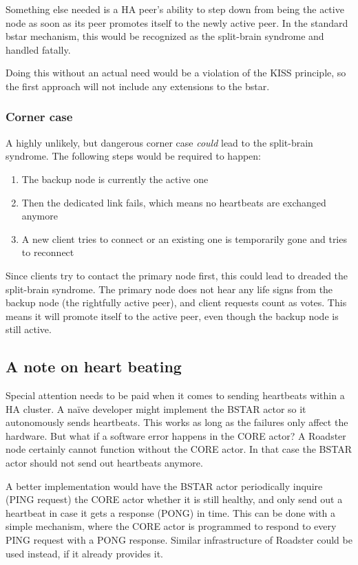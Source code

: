 Something else needed is a HA peer's ability to step down from being the
active node as soon as its peer promotes itself to the newly active peer. In
the standard \gls{bstar} mechanism, this would be recognized as the split-brain
syndrome and handled fatally.

Doing this without an actual need would be a violation of the KISS principle,
so the first approach will not include any extensions to the \gls{bstar}.

\subsubsection{Corner case}
A highly unlikely, but dangerous corner case \emph{could} lead to the
split-brain syndrome. The following steps would be required to happen:

\begin{enumerate}
	\item The backup node is currently the active one

	\item Then the dedicated link fails, which means no heartbeats are
		exchanged anymore

	\item A new client tries to connect or an existing one is temporarily
		gone and tries to reconnect
\end{enumerate}

Since clients try to contact the primary node first, this could
lead to dreaded the split-brain syndrome. The primary node does not hear any
life signs from the backup node (the rightfully active peer), and client
requests count as votes. This means it will promote itself to the active peer,
even though the backup node is still active.

\subsection{A note on heart beating}\label{sec:approach:ha:hb}
Special attention needs to be paid when it comes to sending heartbeats within a
HA cluster. A na\"ive developer might implement the BSTAR actor so it
autonomously sends heartbeats. This works as long as the failures only affect
the hardware. But what if a software error happens in the CORE actor?  A
Roadster node certainly cannot function without the CORE actor. In that case the
BSTAR actor should not send out heartbeats anymore.

A better implementation would have the BSTAR actor periodically inquire (PING
request) the CORE actor whether it is still healthy, and only send out a
heartbeat in case it gets a response (PONG) in time. This can be done with a
simple mechanism, where the CORE actor is programmed to respond to every PING
request with a PONG response. Similar infrastructure of Roadster could be used
instead, if it already provides it.

